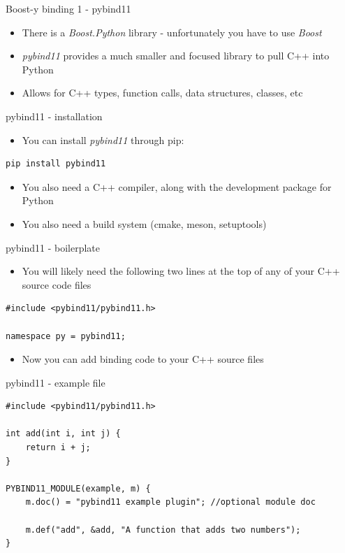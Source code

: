 \documentclass[presentation]{beamer}
\begin{document}
\begin{frame}[label=boost-y-binding-1---pybind11]{Boost-y binding 1 - pybind11}
\begin{itemize}
\item There is a \alert{\emph{Boost.Python}} library - unfortunately you have to use
\alert{\emph{Boost}}
\item \alert{\emph{pybind11}} provides a much smaller and focused library to pull C++
into Python
\item Allows for C++ types, function calls, data structures, classes, etc
\end{itemize}
\end{frame}
\begin{frame}[label=pybind11---installation,fragile]{pybind11 - installation}
 \begin{itemize}
\item You can install \alert{\emph{pybind11}} through pip:
\end{itemize}

\begin{verbatim}
pip install pybind11
\end{verbatim}

\begin{itemize}
\item You also need a C++ compiler, along with the development package for
Python
\item You also need a build system (cmake, meson, setuptools)
\end{itemize}
\end{frame}
\begin{frame}[label=pybind11---boilerplate,fragile]{pybind11 - boilerplate}
 \begin{itemize}
\item You will likely need the following two lines at the top of any of your
C++ source code files
\end{itemize}

\begin{verbatim}
#include <pybind11/pybind11.h>

namespace py = pybind11;
\end{verbatim}

\begin{itemize}
\item Now you can add binding code to your C++ source files
\end{itemize}
\end{frame}
\begin{frame}[label=pybind11---example-file,fragile]{pybind11 - example file}
 \begin{verbatim}
#include <pybind11/pybind11.h>

int add(int i, int j) {
    return i + j;
}

PYBIND11_MODULE(example, m) {
    m.doc() = "pybind11 example plugin"; //optional module doc

    m.def("add", &add, "A function that adds two numbers");
}
\end{verbatim}
\end{frame}
\end{document}
